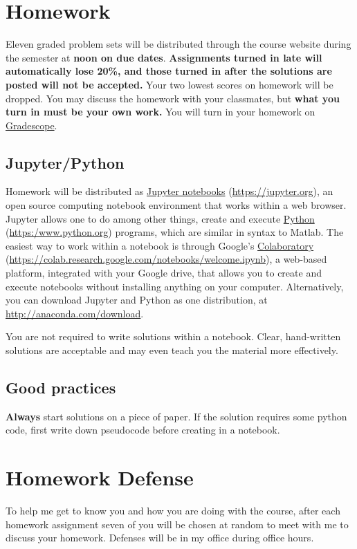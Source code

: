\documentclass[11pt]{article}
\begin{document}
\section{Homework}
\label{sec:org29a701f}
Eleven graded problem sets will be distributed through the course website during the semester at \textbf{noon on due dates}.  \textbf{Assignments turned in late will automatically lose 20\%, and those turned in after the solutions are posted will not be accepted.}  Your two lowest scores on homework will be dropped.  You may discuss the homework with your classmates, but \textbf{what you turn in must be your own work.} You will turn in your homework on \href{https://www.gradescope.com/courses/933965}{Gradescope}.
\subsection{Jupyter/Python}
\label{sec:org5bf4dec}
Homework will be distributed as \href{https://jupyter.org/}{Jupyter notebooks} (\url{https://jupyter.org}), an open source computing notebook environment that works within a web browser. Jupyter allows one to do among other things, create and execute \href{https://www.python.org/}{Python} (\url{https:/www.python.org}) programs, which are similar in syntax to Matlab. The easiest way to work within a notebook is through Google's \href{https://colab.research.google.com/notebooks/welcome.ipynb}{Colaboratory} (\url{https://colab.research.google.com/notebooks/welcome.ipynb}), a web-based platform, integrated with your Google drive, that allows you to create and execute notebooks without installing anything on your computer. Alternatively, you can download Jupyter and Python as one distribution, at \url{http://anaconda.com/download}. 

You are not required to write solutions within a notebook. Clear, hand-written solutions are acceptable and may even teach you the material more effectively.
\subsection{Good practices}
\label{sec:org3f00f77}
\textbf{Always} start solutions on a piece of paper. If the solution requires some python code, first write down pseudocode before creating in a notebook. 
\section{Homework Defense}
\label{sec:org191d34c}
To help me get to know you and how you are doing with the course, after each homework assignment seven of you will be chosen at random to meet with me to discuss your homework. Defenses will be in my office during office hours.
\end{document}
